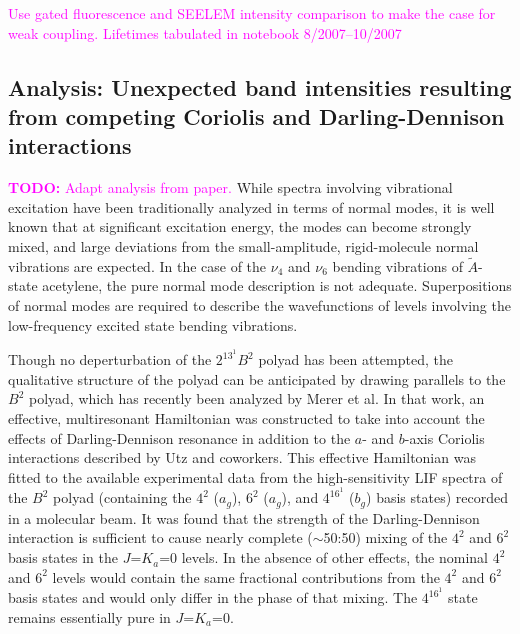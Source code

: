 \documentclass[12pt]{mitthesis}
\newcommand{\TODO} [1]{\textcolor{magenta}{\textbf{TODO:} #1}}
\newcommand{\POINT}[1]{\textcolor{magenta}{#1}}
\begin{document}
\POINT{Use gated fluorescence and SEELEM intensity comparison to make
  the case for weak coupling. Lifetimes tabulated in notebook
  8/2007--10/2007}


\subsection{Analysis: Unexpected band intensities resulting from
  competing Coriolis and Darling-Dennison interactions}

\TODO{Adapt analysis from paper.}  While spectra involving vibrational
excitation have been traditionally analyzed in terms of normal modes,
it is well known that at significant excitation energy, the modes can
become strongly mixed, and large deviations from the small-amplitude,
rigid-molecule normal vibrations are expected.  In the case of the
$\nu_4$ and $\nu_6$ bending vibrations of $\tilde{A}$-state acetylene,
the pure normal mode description is not adequate. Superpositions of
normal modes are required to describe the wavefunctions of levels
involving the low-frequency excited state bending vibrations.

Though no deperturbation of the $2^13^1B^2$ polyad has been attempted,
the qualitative structure of the polyad can be anticipated by drawing
parallels to the $B^2$ polyad, which has recently been analyzed by
Merer et al.  In that work, an effective, multiresonant Hamiltonian
was constructed to take into account the effects of Darling-Dennison
resonance in addition to the $a$- and $b$-axis Coriolis interactions
described by Utz and coworkers.  This effective Hamiltonian was fitted
to the available experimental data from the high-sensitivity LIF
spectra of the $B^2$ polyad (containing the $4^2$ ($a_g$), $6^2$
($a_g$), and $4^16^1$ ($b_g$) basis states) recorded in a molecular
beam. It was found that the strength of the Darling-Dennison
interaction is sufficient to cause nearly complete ($\sim$50:50)
mixing of the $4^2$ and $6^2$ basis states in the $J$=$K_a$=0
levels. In the absence of other effects, the nominal $4^2$ and $6^2$
levels would contain the same fractional contributions from the $4^2$
and $6^2$ basis states and would only differ in the phase of that
mixing.  The $4^16^1$ state remains essentially pure in $J$=$K_a$=0.
\end{document}
